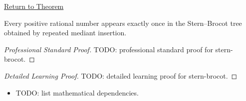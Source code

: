 \newpage
{}
\label{prf:stern-brocot}

\begin{remark*}[Return]
\hyperref[thm:stern-brocot]{Return to Theorem}
\end{remark*}

\begin{theorem*}
Every positive rational number appears exactly once in the
Stern--Brocot tree obtained by repeated mediant insertion.
\end{theorem*}

\begin{proof}[Professional Standard Proof]
\LRAProofBodyStart
TODO: professional standard proof for stern-brocot.
\end{proof}

\begin{proof}[Detailed Learning Proof]
\LRAProofBodyStart
TODO: detailed learning proof for stern-brocot.
\end{proof}

\begin{remark*}
\end{remark*}

\begin{dependencies}
\begin{itemize}
  \item TODO: list mathematical dependencies.
\end{itemize}
\end{dependencies}

\clearpage
